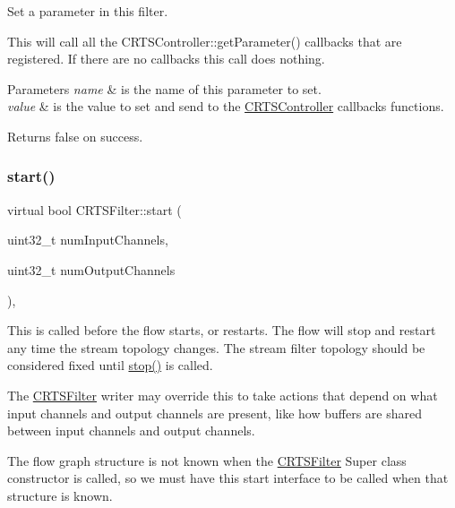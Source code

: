 Set a parameter in this filter.

This will call all the C\+R\+T\+S\+Controller\+::get\+Parameter() callbacks that are registered. If there are no callbacks this call does nothing.


\begin{DoxyParams}{Parameters}
{\em name} & is the name of this parameter to set.\\
\hline
{\em value} & is the value to set and send to the \hyperlink{classCRTSController}{C\+R\+T\+S\+Controller} callbacks functions.\\
\hline
\end{DoxyParams}
\begin{DoxyReturn}{Returns}
false on success. 
\end{DoxyReturn}
\mbox{\label{classCRTSFilter_a15a3e99b38a67fd40559776d468b95fa}} 
\subsubsection{\texorpdfstring{start()}{start()}}
{\footnotesize\ttfamily virtual bool C\+R\+T\+S\+Filter\+::start (\begin{DoxyParamCaption}\item[{uint32\+\_\+t}]{num\+Input\+Channels,  }\item[{uint32\+\_\+t}]{num\+Output\+Channels }\end{DoxyParamCaption})\hspace{0.3cm}{\ttfamily [inline]}, {\ttfamily [virtual]}}

This is called before the flow starts, or restarts. The flow will stop and restart any time the stream topology changes. The stream filter topology should be considered fixed until \hyperlink{classCRTSFilter_a934e38c5cd6bd82b309166180f664f0c}{stop()} is called.

The \hyperlink{classCRTSFilter}{C\+R\+T\+S\+Filter} writer may override this to take actions that depend on what input channels and output channels are present, like how buffers are shared between input channels and output channels.

The flow graph structure is not known when the \hyperlink{classCRTSFilter}{C\+R\+T\+S\+Filter} Super class constructor is called, so we must have this start interface to be called when that structure is known.


